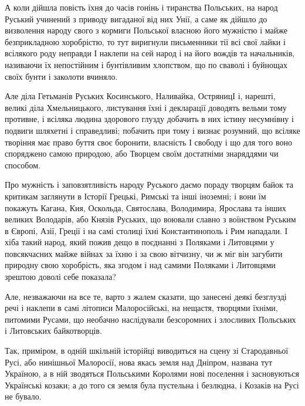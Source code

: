 А коли дійшла повість їхня до часів гонінь і тиранства Польських,
на народ Руський учинений з приводу вигаданої від них Унії, а саме як дійшло до
визволення народу свого з кормиги Польської власною його мужністю і майже
безприкладною хоробрістю, то тут виригнули письменники тії всі свої лайки і
всілякого роду неправди І наклепи на сей народ і на його вождів та начальників,
називаючи їх непостійним і бунтівливим хлопством, що по сваволі і буйнощах
своїх бунти і заколоти вчиняло. 

Але діла Гетьманів Руських Косинського, Наливайка, ОстряницІ і, нарешті, великі
діла Хмельницького, листування їхні і декларації доводять вельми тому противне,
і всіляка людина здорового глузду добачить в них істину несумнівну і подвиги
шляхетні і справедливі; побачить при тому і визнає розумний, що всіляке
творіння має право буття своє боронити, власність І свободу і що для того воно
споряджено самою природою, або Творцем своїм достатніми знаряддями чи способом.

Про мужність і заповзятливість народу Руського даємо пораду творцям байок та
критикам заглянути в Історії Грецькі, Римські та інші іноземні; і вони їм
покажуть Кагана, Кия, Оскольда, Святослава, Володимира, Ярослава та інших
великих Володарів, або Князів Руських, що воювали славно з воїнством Руським в
Європі, Азії, Греції і на самі столиці їхні Константинополь і Рим нападали. І
хіба такий народ, який пожив дещо в поєднанні з Поляками і Литовцями у
повсякчасних майже війнах за їхню і за свою вітчизну, чи ж міг він загубити
природну свою хоробрість, яка згодом і над самими Поляками і Литовцями зрештою
доволі себе показала?

Але, незважаючи на все те, варто з жалем сказати, що занесені деякі безглузді
речі і наклепи в самі літописи Малоросійські, на нещастя, творцями їхніми,
питомими Русами, що необачно наслідували безсоромних і злосливих Польських і
Литовських байкотворців. 

Так, приміром, в одній шкільній історійці виводиться
на сцену зі Стародавньої Русі, або нинішньої Малоросії, нова якась земля над
Дніпром, названа тут Україною, а в ній зводяться Польськими Королями нові
поселення і засновуються Українські козаки; а до того ся земля була пустельна і
безлюдна, і Козаків на Русі не бувало. 

